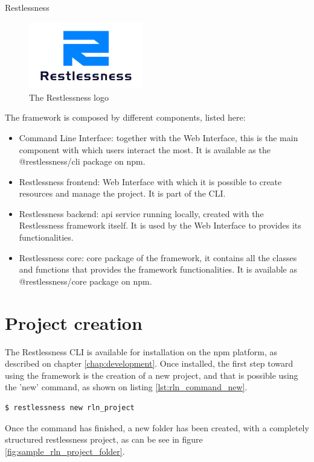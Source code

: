 \begin{chapter}{Restlessness}
    \label{chap:restlessness}

    \begin{figure}
        \centering
        \includegraphics[width=5cm]{source/images/restlessness_logo.png}
        \caption{The Restlessness logo}
    \end{figure}

    The framework is composed by different components, listed here:
    \begin{itemize}
        \item Command Line Interface: together with the Web Interface, this is the
            main component with which users interact the most. It is available as
            the @restlessness/cli package on npm.
        \item Restlessness frontend: Web Interface with which it is possible to
            create resources and manage the project. It is part of the CLI.
        \item Restlessness backend: api service running locally, created with the
            Restlessness framework itself. It is used by the Web Interface to
            provides its functionalities.
        \item Restlessness core: core package of the framework, it contains all the
            classes and functions that provides the framework functionalities. It is
            available as @restlessness/core package on npm.
    \end{itemize}

    \section{Project creation}
    \label{sec:rln_project_creation}

    The Restlessness CLI is available for installation on the npm platform, as described
    on chapter \ref{chap:development}. %
    Once installed, the first step toward using the framework is
    the creation of a new project, and that is possible using the 'new' command, as shown
    on listing \ref{lst:rln_command_new}.
    \begin{lstlisting}[caption=New command, label={lst:rln_command_new}]
$ restlessness new rln_project
    \end{lstlisting}
    Once the command has finished, a new folder has been created, with a completely
    structured restlessness project, as can be see in figure \ref{fig:sample_rln_project_folder}.


\end{chapter}
